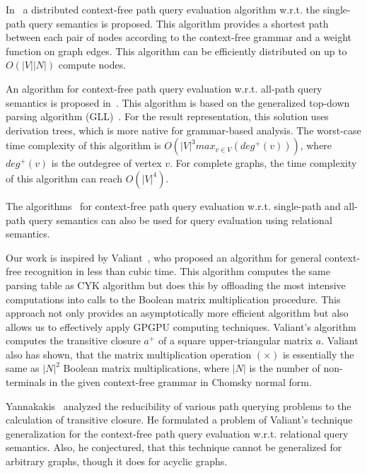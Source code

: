 In~\cite{ward2008distributed} a distributed context-free path query evaluation algorithm w.r.t. the single-path query semantics is proposed. This algorithm provides a shortest path between each pair of nodes according to the context-free grammar and a weight function on graph edges. This algorithm can be efficiently distributed on up to $O(|V||N|)$ compute nodes.

An algorithm for context-free path query evaluation w.r.t. all-path query semantics is proposed in~\cite{GLL}. This algorithm is based on the generalized top-down parsing algorithm (GLL)~\cite{scott2010gll}. For the result representation, this solution uses derivation trees, which is more native for grammar-based analysis. The worst-case time complexity of this algorithm is $O(|V|^3 max_{v\in V} (deg^+(v)))$, where $deg^+(v)$ is the outdegree of vertex $v$. For complete graphs, the time complexity of this algorithm can reach $O(|V|^4)$.

The algorithms~\cite{GLL,hellingsPathQuerying} for context-free path query evaluation w.r.t. single-path and all-path query semantics can also be used for query evaluation using relational semantics.

Our work is inspired by Valiant~\cite{valiant}, who proposed an algorithm for general context-free recognition in less than cubic time. This algorithm computes the same parsing table as CYK algorithm but does this by offloading the most intensive computations into calls to the Boolean matrix multiplication procedure. This approach not only provides an asymptotically more efficient algorithm but also allows us to effectively apply GPGPU computing techniques. Valiant's algorithm computes the transitive closure $a^+$ of a square upper-triangular matrix $a$. Valiant also has shown, that the matrix multiplication operation $(\times)$ is essentially the same as $|N|^2$ Boolean matrix multiplications, where $|N|$ is the number of non-terminals in the given context-free grammar in Chomsky normal form.

Yannakakis~\cite{transitive-closure} analyzed the reducibility of various path querying problems to the calculation of transitive closure. He formulated a problem of Valiant's technique generalization for the context-free path query evaluation w.r.t. relational query semantics. Also, he conjectured, that this technique cannot be generalized for arbitrary graphs, though it does for acyclic graphs.
